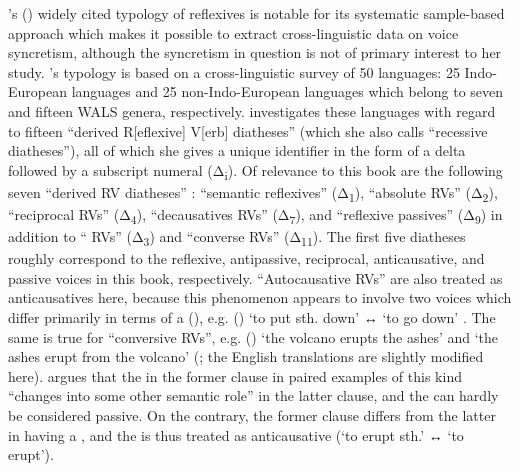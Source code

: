 \citeauthor{geniusiene:1987}’s (\citeyear{geniusiene:1987}) widely cited typology of reflexives is notable for its systematic sample-based approach which makes it possible to extract cross-linguistic data on voice syncretism, although the syncretism in question is not of primary interest to her study. \citeauthor{geniusiene:1987}’s typology is based on a cross-linguistic survey of 50 languages: 25 Indo-European languages and 25 non-Indo-European languages which belong to seven and fifteen WALS genera, respectively. \cite[57, 220ff.]{geniusiene:1987} investigates these languages with regard to fifteen “derived R[eflexive] V[erb] diatheses” (which she also calls “recessive diatheses”), all of which she gives a unique identifier in the form of a delta followed by a subscript numeral (Δ\textsubscript{i}). Of relevance to this book are the following seven “derived RV diatheses” \citep[230]{geniusiene:1987}: “semantic reflexives” (Δ\textsubscript{1}), “absolute RVs” (Δ\textsubscript{2}), “reciprocal RVs” (Δ\textsubscript{4}), “decausatives RVs” (Δ\textsubscript{7}), and “reflexive passives” (Δ\textsubscript{9}) in addition to “ RVs” (Δ\textsubscript{3}) and “converse RVs” (Δ\textsubscript{11}). The first five diatheses roughly correspond to the reflexive, antipassive, reciprocal, anticausative, and passive voices in this book, respectively. “Autocausative RVs” are also treated as anticausatives here, because this phenomenon appears to involve two voices which differ primarily in terms of a  (), e.g.  ()  ‘to put sth. down’ ↔  ‘to go down’ \citep[316]{geniusiene:1987}. The same is true for “conversive RVs”, e.g.  ()  ‘the volcano erupts the ashes’ and  ‘the ashes erupt from the volcano’ (\citealt[273]{geniusiene:1987}; the English translations are slightly modified here). \cite[228]{geniusiene:1987} argues that the  in the former clause in paired examples of this kind “changes into some other semantic role” in the latter clause, and the  can hardly be considered passive. On the contrary, the former clause differs from the latter in having a , and the  is thus treated as anticausative (‘to erupt sth.’ ↔ ‘to erupt’).

